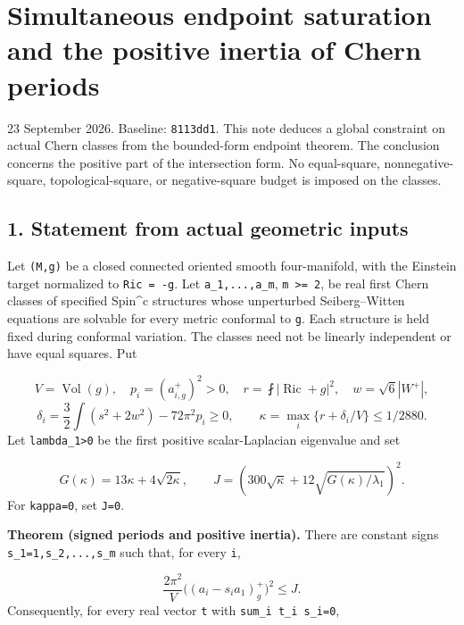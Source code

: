 \documentclass[
  11pt,
]{article}
\author{}
\date{23 September 2026}
\begin{document}
\hypertarget{simultaneous-endpoint-saturation-and-the-positive-inertia-of-chern-periods}{%
\section{Simultaneous endpoint saturation and the positive inertia of
Chern
periods}\label{simultaneous-endpoint-saturation-and-the-positive-inertia-of-chern-periods}}

23 September 2026. Baseline: \texttt{8113dd1}. This note deduces a
global constraint on actual Chern classes from the bounded-form endpoint
theorem. The conclusion concerns the positive part of the intersection
form. No equal-square, nonnegative-square, topological-square, or
negative-square budget is imposed on the classes.

\hypertarget{statement-from-actual-geometric-inputs}{%
\subsection{1. Statement from actual geometric
inputs}\label{statement-from-actual-geometric-inputs}}

Let \texttt{(M,g)} be a closed connected oriented smooth four-manifold,
with the Einstein target normalized to \texttt{Ric\ =\ -g}. Let
\texttt{a\_1,...,a\_m}, \texttt{m\ \textgreater{}=\ 2}, be real first
Chern classes of specified Spin\^{}c structures whose unperturbed
Seiberg--Witten equations are solvable for every metric conformal to
\texttt{g}. Each structure is held fixed during conformal variation. The
classes need not be linearly independent or have equal squares. Put

\[
 V=\operatorname{Vol}(g),\quad
 p_i=(a_{i,g}^+)^2>0,\quad
 r=\fint|\operatorname{Ric}+g|^2,\quad w=\sqrt6|W^+|,
\] \[
 \delta_i=\frac32\int(s^2+2w^2)-72\pi^2p_i\ge0,
 \qquad \kappa=\max_i\{r+\delta_i/V\}\le1/2880.
 \tag{1}
\] Let \texttt{lambda\_1\textgreater{}0} be the first positive
scalar-Laplacian eigenvalue and set

\[
 G(\kappa)=13\kappa+4\sqrt{2\kappa},\qquad
 J=\left(300\sqrt\kappa+
                  12\sqrt{G(\kappa)/\lambda_1}\right)^2.
 \tag{2}
\] For \texttt{kappa=0}, set \texttt{J=0}.

\textbf{Theorem (signed periods and positive inertia).} There are
constant signs \texttt{s\_1=1,s\_2,...,s\_m} such that, for every
\texttt{i},

\[
 \boxed{\frac{2\pi^2}{V}
             \bigl((a_i-s_i a_1)_g^+\bigr)^2\le J.}
 \tag{3}
\] Consequently, for every real vector \texttt{t} with
\texttt{sum\_i\ t\_i\ s\_i=0},
\end{document}
